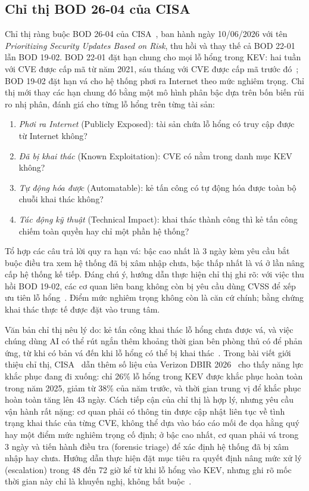 \documentclass[conference]{IEEEtran}
\begin{document}
\subsection{Chỉ thị BOD 26-04 của CISA}
\begin{sloppypar}
Chỉ thị ràng buộc BOD 26-04 của CISA~\cite{bod2604}, ban hành ngày 10/06/2026 với tên
\emph{Prioritizing Security Updates Based on Risk}, thu hồi và thay thế cả BOD 22-01 lẫn BOD 19-02. BOD 22-01 đặt hạn chung cho mọi lỗ hổng trong KEV: hai tuần với CVE được cấp mã từ năm 2021, sáu tháng với CVE được cấp mã trước đó~\cite{bod2201}; BOD 19-02 đặt hạn vá cho hệ thống phơi ra Internet theo mức nghiêm trọng. Chỉ thị mới thay các hạn chung đó bằng một mô hình phân bậc dựa trên bốn biến rủi ro nhị phân, đánh giá cho từng lỗ hổng trên từng tài sản:
\end{sloppypar}
\begin{enumerate}
\item \emph{Phơi ra Internet} (Publicly Exposed): tài sản chứa lỗ hổng có truy cập được từ Internet không?
\item \emph{Đã bị khai thác} (Known Exploitation): CVE có nằm trong danh mục KEV không?
\item \emph{Tự động hóa được} (Automatable): kẻ tấn công có tự động hóa được toàn bộ chuỗi khai thác không?
\item \emph{Tác động kỹ thuật} (Technical Impact): khai thác thành công thì kẻ tấn công chiếm toàn quyền hay chỉ một phần hệ thống?
\end{enumerate}
Tổ hợp các câu trả lời quy ra hạn vá: bậc cao nhất là 3 ngày kèm yêu cầu bắt buộc điều tra xem hệ thống đã bị
xâm nhập chưa, bậc thấp nhất là vá ở lần nâng cấp hệ thống kế tiếp. Đáng chú ý, hướng dẫn thực hiện chỉ thị ghi rõ: với việc thu hồi BOD 19-02, các cơ quan liên bang không còn bị yêu cầu dùng CVSS để xếp ưu tiên lỗ hổng~\cite{bod2604ig}. Điểm mức nghiêm trọng không còn là căn cứ chính; bằng chứng khai thác thực tế được đặt vào trung tâm.

Văn bản chỉ thị nêu lý do: kẻ tấn công khai thác lỗ hổng chưa được vá, và việc chúng dùng AI có thể rút ngắn thêm khoảng thời gian bên phòng thủ có để phản ứng, từ khi có bản vá đến khi lỗ hổng có thể bị khai thác~\cite{bod2604}. Trong bài viết giới thiệu chỉ thị, CISA~\cite{cisablog2026} dẫn thêm số liệu của Verizon DBIR 2026~\cite{dbir2026} cho thấy năng lực khắc phục đang đi xuống: chỉ 26\% lỗ hổng trong KEV được khắc phục hoàn toàn trong năm 2025, giảm từ 38\% của năm trước, và thời gian trung vị để khắc phục hoàn toàn tăng lên 43 ngày.
Cách tiếp cận của chỉ thị là hợp lý, nhưng yêu cầu vận hành rất nặng: cơ quan phải có thông tin được cập nhật liên tục về tình trạng khai thác
của từng CVE, không thể dựa vào báo cáo mối đe dọa hằng quý hay một điểm mức nghiêm trọng
cố định; ở bậc cao nhất, cơ quan phải vá trong 3 ngày và tiến hành điều tra (forensic triage) để xác định hệ thống đã bị xâm nhập hay chưa. Hướng dẫn thực hiện đặt mục tiêu ra quyết định nâng mức xử lý (escalation) trong 48 đến 72 giờ kể từ khi lỗ hổng vào KEV, nhưng ghi rõ mốc thời gian này chỉ là khuyến nghị, không bắt buộc~\cite{bod2604ig}.
\end{document}
